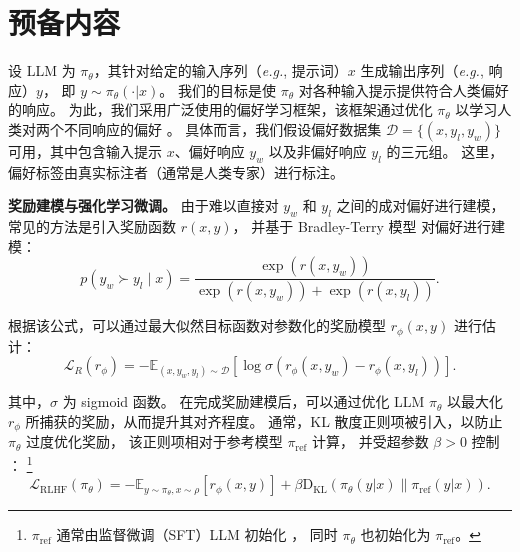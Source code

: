 \section{预备内容}\label{sec:preliminary}

设 LLM 为 $\pi_{\theta}$，其针对给定的输入序列（\textit{e.g.}, 提示词）$x$ 生成输出序列（\textit{e.g.}, 响应）$y$，
即 $y \sim \pi_{\theta}(\cdot|x)$。  
我们的目标是使 $\pi_{\theta}$ 对各种输入提示提供符合人类偏好的响应。  
为此，我们采用广泛使用的偏好学习框架，该框架通过优化 $\pi_{\theta}$ 以学习人类对两个不同响应的偏好 
\citep{christiano2017deep,lee2021pebble,ouyang2022training}。  
具体而言，我们假设偏好数据集 $\mathcal{D}=\{(x,y_l,y_w)\}$ 可用，其中包含输入提示 $x$、偏好响应 $y_w$ 以及非偏好响应 $y_l$ 的三元组。  
这里，偏好标签由真实标注者（通常是人类专家）进行标注。  

\textbf{奖励建模与强化学习微调。}  
由于难以直接对 $y_w$ 和 $y_l$ 之间的成对偏好进行建模，常见的方法是引入奖励函数 $r(x,y)$，
并基于 Bradley-Terry 模型 \citep{bradley1952rank} 对偏好进行建模：
\begin{equation}
p(y_{w} \succ y_{l} \mid x) = \frac{\exp\left(r(x, y_w)\right)}{\exp\left(r(x, y_w)\right) + \exp\left(r(x, y_l)\right)}.
\label{eq:bt_reward}
\end{equation}

根据该公式，可以通过最大似然目标函数对参数化的奖励模型 $r_{\phi}(x,y)$ 进行估计：
\begin{equation}
    \mathcal{L}_R(r_\phi) = -\mathbb{E}_{(x, y_w, y_l) \sim \mathcal{D}} \left[ \log \sigma \left( r_\phi(x, y_w) - r_\phi(x, y_l) \right) \right].
\end{equation}

其中，$\sigma$ 为 sigmoid 函数。  
在完成奖励建模后，可以通过优化 LLM $\pi_{\theta}$ 以最大化 $r_\phi$ 所捕获的奖励，从而提升其对齐程度。  
通常，KL 散度正则项被引入，以防止 $\pi_{\theta}$ 过度优化奖励，
该正则项相对于参考模型 $\pi_{\text{ref}}$ 计算，
并受超参数 $\beta > 0$ 控制 \citep{ouyang2022training, ziegler2019fine}：
\footnote{$\pi_{\text{ref}}$ 通常由监督微调（SFT）LLM 初始化 \citep{chung2024scaling, wei2022finetuned}，
同时 $\pi_{\theta}$ 也初始化为 $\pi_{\text{ref}}$。}  
\begin{equation}
\mathcal{L}_\text{RLHF}(\pi_{\theta}) = -\mathbb{E}_{y \sim \pi_{\theta}, x \sim \rho} \left[ r_{\phi}(x,y) \right] + \beta \mathrm{D}_{\mathrm{KL}} \left( \pi_{\theta}(y|x) \parallel \pi_{\text{ref}}(y|x) \right).
\label{eq:rlhf}
\end{equation}

